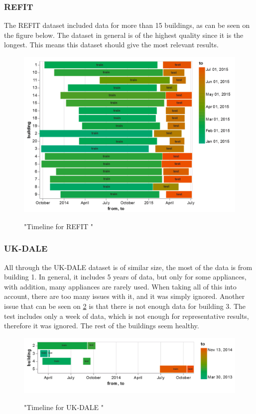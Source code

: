 \subsubsection{REFIT}
The REFIT dataset included data for more than 15 buildings, as can be seen on the figure below.
The dataset in general is of the highest quality since it is the longest. This means this dataset should give the most relevant results.
\begin{figure}[H]
	\centering
	\caption{"Timeline for REFIT "}
	\includegraphics[width=1\textwidth]{Figures/EC/refit_timeline.png}
	\label{fig:refit_timeline}
\end{figure}

\subsubsection{UK-DALE} 

All through the UK-DALE dataset is of similar size, the most of the data is from building 1.
In general, it includes 5 years of data, but only for some appliances, with addition, many appliances are rarely used.
When taking all of this into account, there are too many issues with it, and it was simply ignored.
Another issue that can be seen on \ref{fig:ukdale_timeline} is that there is not enough data for 
building 3. The test includes only a week of data, which is not enough for representative results, therefore it was ignored.
The rest of the buildings seem healthy.

\begin{figure}[H]
	\centering
	\caption{"Timeline for UK-DALE "}
	\includegraphics[width=1\textwidth]{Figures/EC/ukdale_timeline.png}
	\label{fig:ukdale_timeline}
\end{figure}

